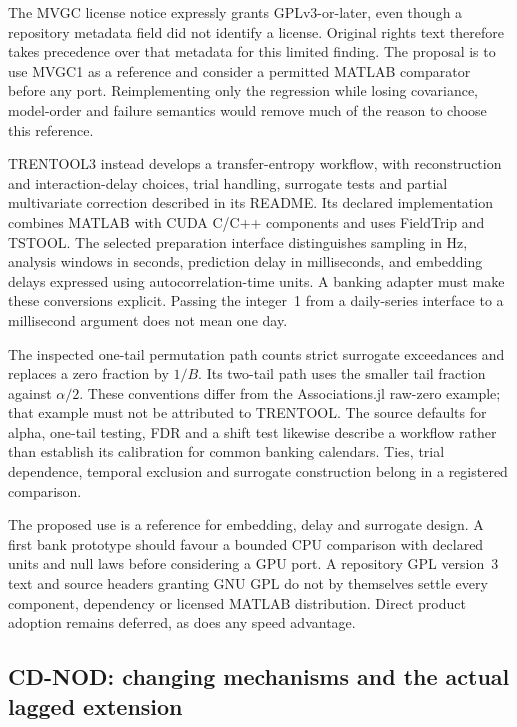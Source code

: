 The MVGC license notice expressly grants GPLv3-or-later, even though a
repository metadata field did not identify a license. Original rights text
therefore takes precedence over that metadata for this limited finding.
The proposal is to use MVGC1 as a reference and consider a permitted MATLAB
comparator before any port. Reimplementing only the regression while losing
covariance, model-order and failure semantics would remove much of the
reason to choose this reference.
\citep{exec17_temporal_mvgc}

TRENTOOL3 instead develops a transfer-entropy workflow, with reconstruction
and interaction-delay choices, trial handling, surrogate tests and
partial multivariate correction described in its README. Its declared
implementation combines MATLAB with CUDA C/C++ components and uses FieldTrip
and TSTOOL. The selected preparation interface distinguishes sampling in Hz,
analysis windows in seconds, prediction delay in milliseconds, and embedding
delays expressed using autocorrelation-time units. A banking adapter must make
these conversions explicit. Passing the integer~1 from a daily-series
interface to a millisecond argument does not mean one day.
\citep{exec17_temporal_trentool}

The inspected one-tail permutation path counts strict surrogate exceedances
and replaces a zero fraction by $1/B$. Its two-tail path uses the smaller
tail fraction against $\alpha/2$. These conventions differ from the
Associations.jl raw-zero example; that example must not be attributed to
TRENTOOL. The source defaults for alpha, one-tail testing, FDR and a shift
test likewise describe a workflow rather than establish its calibration for
common banking calendars. Ties, trial dependence, temporal exclusion and
surrogate construction belong in a registered comparison.
\citep{exec17_temporal_trentool}

The proposed use is a reference for embedding, delay and surrogate design.
A first bank prototype should favour a bounded CPU comparison with declared
units and null laws before considering a GPU port. A repository GPL version~3
text and source headers granting GNU GPL do not by themselves settle every
component, dependency or licensed MATLAB distribution. Direct product adoption
remains deferred, as does any speed advantage.
\citep{exec17_temporal_trentool}

\subsection{CD-NOD: changing mechanisms and the actual lagged extension}

